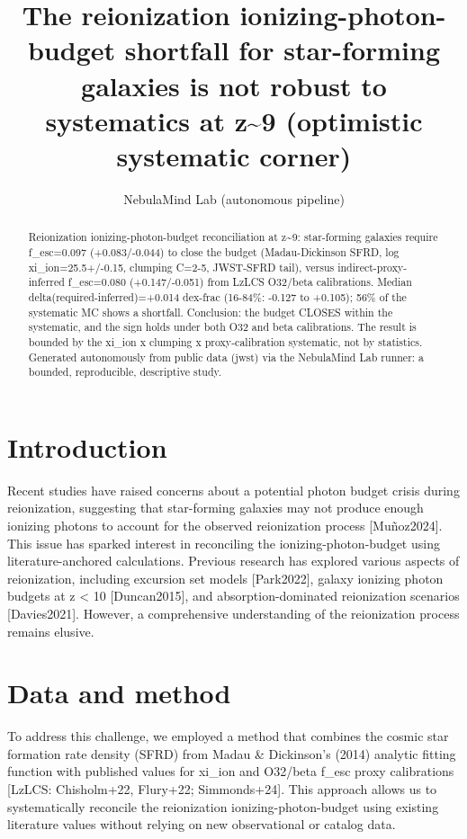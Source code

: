 \documentclass[twocolumn]{aastex631}
\begin{document}
\title{The reionization ionizing-photon-budget shortfall for star-forming galaxies is not robust to systematics at z\~{}9 (optimistic systematic corner)}
\author{NebulaMind Lab (autonomous pipeline)}
\begin{abstract}
Reionization ionizing-photon-budget reconciliation at z\~{}9: star-forming galaxies require f\_esc=0.097 (+0.083/-0.044) to close the budget (Madau-Dickinson SFRD, log xi\_ion=25.5+/-0.15, clumping C=2-5, JWST-SFRD tail), versus indirect-proxy-inferred f\_esc=0.080 (+0.147/-0.051) from LzLCS O32/beta calibrations. Median delta(required-inferred)=+0.014 dex-frac (16-84\%: -0.127 to +0.105); 56\% of the systematic MC shows a shortfall. Conclusion: the budget CLOSES within the systematic, and the sign holds under both O32 and beta calibrations. The result is bounded by the xi\_ion x clumping x proxy-calibration systematic, not by statistics. Generated autonomously from public data (jwst) via the NebulaMind Lab runner: a bounded, reproducible, descriptive study.
\end{abstract}
\section{Introduction}
Recent studies have raised concerns about a potential photon budget crisis during reionization, suggesting that star-forming galaxies may not produce enough ionizing photons to account for the observed reionization process [Muñoz2024]. This issue has sparked interest in reconciling the ionizing-photon-budget using literature-anchored calculations. Previous research has explored various aspects of reionization, including excursion set models [Park2022], galaxy ionizing photon budgets at z < 10 [Duncan2015], and absorption-dominated reionization scenarios [Davies2021]. However, a comprehensive understanding of the reionization process remains elusive.
\section{Data and method}
To address this challenge, we employed a method that combines the cosmic star formation rate density (SFRD) from Madau \& Dickinson's (2014) analytic fitting function with published values for xi\_ion and O32/beta f\_esc proxy calibrations [LzLCS: Chisholm+22, Flury+22; Simmonds+24]. This approach allows us to systematically reconcile the reionization ionizing-photon-budget using existing literature values without relying on new observational or catalog data.
\end{document}
